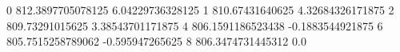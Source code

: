 0 812.3897705078125 6.04229736328125
1 810.67431640625 4.32684326171875
2 809.73291015625 3.38543701171875
4 806.1591186523438 -0.1883544921875
6 805.7515258789062 -0.595947265625
8 806.3474731445312 0.0
